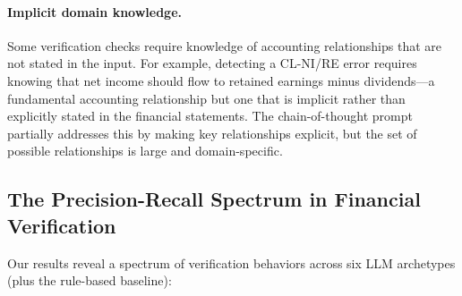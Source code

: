 \documentclass[11pt]{article}
\begin{document}
\paragraph{Implicit domain knowledge.}
Some verification checks require knowledge of accounting relationships that are not stated in the input.
For example, detecting a CL-NI/RE error requires knowing that net income should flow to retained earnings minus dividends---a fundamental accounting relationship but one that is implicit rather than explicitly stated in the financial statements.
The chain-of-thought prompt partially addresses this by making key relationships explicit, but the set of possible relationships is large and domain-specific.

\subsection{The Precision-Recall Spectrum in Financial Verification}
\label{sec:analysis:rulevllm}

Our results reveal a spectrum of verification behaviors across six LLM archetypes (plus the rule-based baseline):
\end{document}

